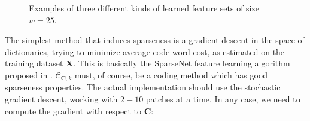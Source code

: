 \documentclass[12pt,a4paper,oneside,english]{UPBThesis}
\begin{document}
\begin{figure}
\centering
{}
\caption{Examples of three different kinds of learned feature sets of size $w=25$.}
\label{fig:ObtainingSetLearn}
\end{figure}

The simplest method that induces sparseness is a gradient descent in the space of dictionaries, trying to minimize average code word cost, as estimated on the training dataset $\textbf{X}$. This is basically the SparseNet feature learning algorithm proposed in \cite{emergence-sparse-coding}. $\mathcal{C}_{\textbf{C},k}$ must, of course, be a coding method which has good sparseness properties. The actual implementation should use the stochastic gradient descent, working with $2-10$ patches at a time. In any case, we need to compute the gradient with respect to $\textbf{C}$:
\end{document}
